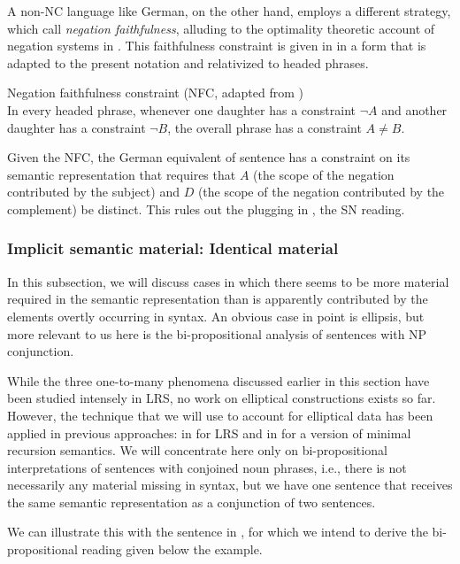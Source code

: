 \documentclass[output=paper]{langsci/langscibook}
\begin{document}
A non-NC language like German, on the other hand, employs a different strategy, which \citet{Richter:Sailer:06} call \emph{negation faithfulness}, alluding to the optimality theoretic account of negation systems in \citet{deSwart:10}. This faithfulness constraint is given in  in a form that is adapted to the present notation and relativized to headed phrases.

\ea \label{neg-faith}
Negation faithfulness constraint (NFC, adapted from \citealt{Richter:Sailer:06})\\
In every headed phrase, whenever one daughter has a constraint $\lnot A$ and another daughter has a constraint $\lnot B$, the overall phrase has a constraint $A \not= B$.
\z

Given the NFC, the German equivalent of sentence  has a constraint on its semantic representation that requires that $A$ (the scope of the negation contributed by the subject) and $D$ (the scope of the negation contributed by the complement) be distinct. This rules out the plugging in , the SN reading.

\subsubsection{Implicit semantic material: Identical material}
\label{Sec-ImplicitSemMat}

In this subsection, we will discuss cases in which there seems to be more material required in the semantic representation than is apparently contributed by the elements overtly occurring in syntax. An obvious case in point is ellipsis, but more relevant to us here is the bi-propositional analysis of sentences with NP conjunction.

While the three one-to-many phenomena discussed earlier in this section have been studied intensely in LRS, no work on elliptical constructions exists so far.
However, the technique that we will use to account for elliptical data has been applied in previous approaches: in \citet{Sailer:05.hpsg} for LRS and in \citet{Bonami:Godard:07} for a version of minimal recursion semantics.
We will concentrate here only on bi-propositional interpretations of sentences with conjoined noun phrases, i.e., there is not necessarily any material missing in syntax, but we have one sentence that receives the same semantic representation as a conjunction of two sentences.

We can illustrate this with the sentence in , for which we intend to derive the bi-propositional reading given below the example.
\end{document}
